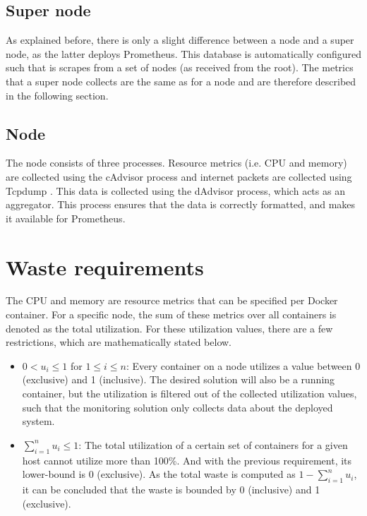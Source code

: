 \subsection{Super node} \label{sec:supernode}
As explained before, there is only a slight difference between a node and a super node, as the latter deploys Prometheus. This database is automatically configured such that is scrapes from a set of nodes (as received from the root). The metrics that a super node collects are the same as for a node and are therefore described in the following section.

\subsection{Node}
The node consists of three processes. Resource metrics (i.e. CPU and memory) are collected using the cAdvisor process and internet packets are collected using Tcpdump \cite{tcpdump}. This data is collected using the dAdvisor process, which acts as an aggregator. This process ensures that the data is correctly formatted, and makes it available for Prometheus.


\section{Waste requirements} \label{sec:waste_requirements}
The CPU and memory are resource metrics that can be specified per Docker container. For a specific node, the sum of these metrics over all containers is denoted as the total utilization. For these utilization values, there are a few restrictions, which are mathematically stated below.

\begin{itemize}
    \item $0 < u_i \leq 1$ for $1 \leq i \leq n$: Every container on a node utilizes a value between 0 (exclusive) and 1 (inclusive). The desired solution will also be a running container, but the utilization is filtered out of the collected utilization values, such that the monitoring solution only collects data about the deployed system.
    \item $\sum_{i=1}^n u_i \leq 1$: The total utilization of a certain set of containers for a given host cannot utilize more than 100\%. And with the previous requirement, its lower-bound is 0 (exclusive). As the total waste is computed as $1 - \sum_{i=1}^n u_i$, it can be concluded that the waste is bounded by 0 (inclusive) and 1 (exclusive).
\end{itemize}

